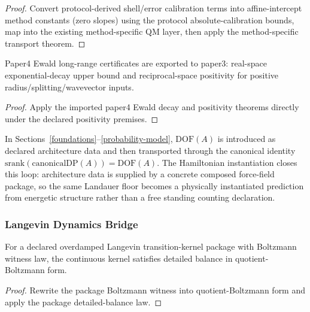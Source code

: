 \begin{proof}
Convert protocol-derived shell/error calibration terms into affine-intercept method constants (zero slopes) using the protocol absolute-calibration bounds, map into the existing method-specific QM layer, then apply the method-specific transport theorem.
\end{proof}

\begin{theorem}\label{thm:ewald-long-range-certificates}
Paper4 Ewald long-range certificates are exported to paper3: real-space exponential-decay upper bound and reciprocal-space positivity for positive radius/splitting/wavevector inputs.
\end{theorem}

\begin{proof}
Apply the imported paper4 Ewald decay and positivity theorems directly under the declared positivity premises.
\end{proof}

\begin{remark}\label{rem:hamiltonian-dof-loop-closure}
In Sections~\ref{foundations}--\ref{probability-model}, $\mathrm{DOF}(A)$ is introduced as declared architecture data and then transported through the canonical identity
\(
\mathrm{srank}(\mathrm{canonicalDP}(A))=\mathrm{DOF}(A)
\).
The Hamiltonian instantiation closes this loop: architecture data is supplied by a concrete composed force-field package, so the same Landauer floor becomes a physically instantiated prediction from energetic structure rather than a free standing counting declaration.
\end{remark}

\subsubsection{Langevin Dynamics Bridge}

\begin{theorem}\label{thm:langevin-detailed-balance-grounding}
For a declared overdamped Langevin transition-kernel package with Boltzmann witness law, the continuous kernel satisfies detailed balance in quotient-Boltzmann form.
\end{theorem}

\begin{proof}
Rewrite the package Boltzmann witness into quotient-Boltzmann form and apply the package detailed-balance law.
\end{proof}

